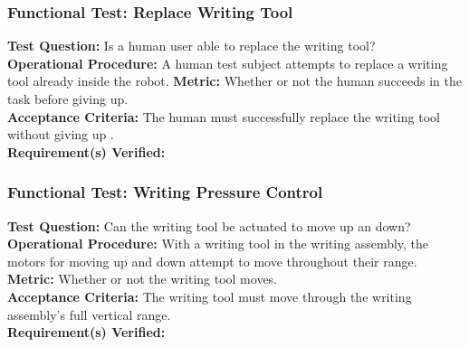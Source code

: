 \subsubsection{Functional Test: Replace Writing Tool}
\label{test:writing_ft_replace}
\textbf{Test Question:} Is a human user able to replace the writing tool? \\
\textbf{Operational Procedure:} A human test subject attempts to replace a writing tool already inside the robot.
\textbf{Metric:} Whether or not the human succeeds in the task before giving up.\\
\textbf{Acceptance Criteria:} The human must successfully replace the writing tool without giving up .  \\
\textbf{Requirement(s) Verified:}  


\subsubsection{Functional Test: Writing Pressure Control}
\label{test:writing_ft_pressure}
\textbf{Test Question:} Can the writing tool be actuated to move up an down?\\
\textbf{Operational Procedure:} With a writing tool in the writing assembly, the motors for moving up and down attempt to move throughout their range. \\
\textbf{Metric:} Whether or not the writing tool moves. \\
\textbf{Acceptance Criteria:} The writing tool must move through the writing assembly's full vertical range. \\
\textbf{Requirement(s) Verified:} 

